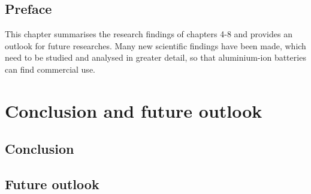 \section*{Preface}
This chapter summarises the research findings of chapters 4-8 and provides an outlook for future researches. Many new scientific findings have been made, which need to be studied and analysed in greater detail, so that aluminium-ion batteries can find commercial use.
\newpage
\chapter{Conclusion and future outlook} %
\label{chap9} %
\section*{Conclusion}
\section{Future outlook}